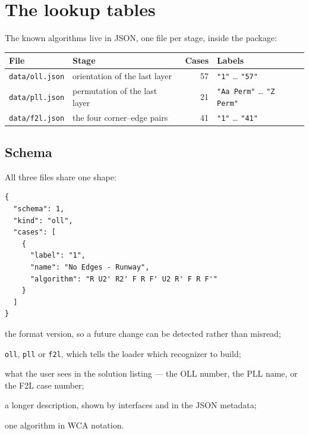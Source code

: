 \section{The lookup tables}
\label{sec:tables}

The known algorithms live in JSON, one file per stage, inside the package:

\begin{center}
\begin{tabular}{@{}llr@{}l@{}}
\toprule
File & Stage & Cases & Labels \\
\midrule
\texttt{data/oll.json} & orientation of the last layer & 57 & \texttt{"1"} \ldots{} \texttt{"57"} \\
\texttt{data/pll.json} & permutation of the last layer & 21 & \texttt{"Aa Perm"} \ldots{} \texttt{"Z Perm"} \\
\texttt{data/f2l.json} & the four corner--edge pairs & 41 & \texttt{"1"} \ldots{} \texttt{"41"} \\
\bottomrule
\end{tabular}
\end{center}

\subsection{Schema}

All three files share one shape:

\begin{lstlisting}[style=data]
{
  "schema": 1,
  "kind": "oll",
  "cases": [
    {
      "label": "1",
      "name": "No Edges - Runway",
      "algorithm": "R U2' R2' F R F' U2 R' F R F'"
    }
  ]
}
\end{lstlisting}

\begin{description}[leftmargin=0em,style=nextline]
  \item[\texttt{schema}] the format version, so a future change can be detected
  rather than misread;
  \item[\texttt{kind}] \texttt{oll}, \texttt{pll} or \texttt{f2l}, which tells the
  loader which recognizer to build;
  \item[\texttt{label}] what the user sees in the solution listing --- the OLL
  number, the PLL name, or the F2L case number;
  \item[\texttt{name}] a longer description, shown by interfaces and in the JSON
  metadata;
  \item[\texttt{algorithm}] one algorithm in WCA notation.
\end{description}

